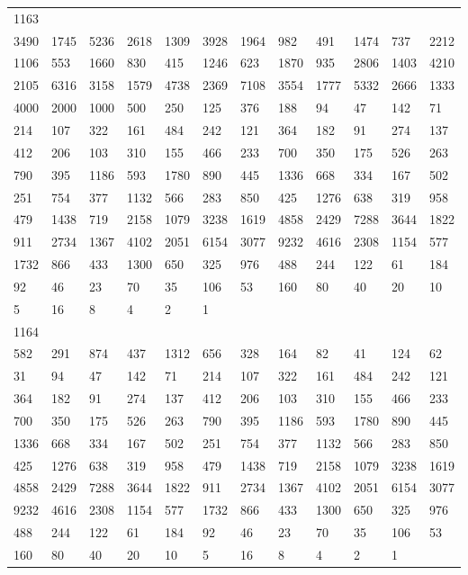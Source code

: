 \begin{longtable}{llllllllllll}
1163&&&&&&&&&&&\\
3490& 1745& 5236& 2618& 1309& 3928& 1964& 982& 491& 1474& 737& 2212\\
1106& 553& 1660& 830& 415& 1246& 623& 1870& 935& 2806& 1403& 4210\\
2105& 6316& 3158& 1579& 4738& 2369& 7108& 3554& 1777& 5332& 2666& 1333\\
4000& 2000& 1000& 500& 250& 125& 376& 188& 94& 47& 142& 71\\
214& 107& 322& 161& 484& 242& 121& 364& 182& 91& 274& 137\\
412& 206& 103& 310& 155& 466& 233& 700& 350& 175& 526& 263\\
790& 395& 1186& 593& 1780& 890& 445& 1336& 668& 334& 167& 502\\
251& 754& 377& 1132& 566& 283& 850& 425& 1276& 638& 319& 958\\
479& 1438& 719& 2158& 1079& 3238& 1619& 4858& 2429& 7288& 3644& 1822\\
911& 2734& 1367& 4102& 2051& 6154& 3077& 9232& 4616& 2308& 1154& 577\\
1732& 866& 433& 1300& 650& 325& 976& 488& 244& 122& 61& 184\\
92& 46& 23& 70& 35& 106& 53& 160& 80& 40& 20& 10\\
5& 16& 8& 4& 2& 1& \\

1164&&&&&&&&&&&\\
582& 291& 874& 437& 1312& 656& 328& 164& 82& 41& 124& 62\\
31& 94& 47& 142& 71& 214& 107& 322& 161& 484& 242& 121\\
364& 182& 91& 274& 137& 412& 206& 103& 310& 155& 466& 233\\
700& 350& 175& 526& 263& 790& 395& 1186& 593& 1780& 890& 445\\
1336& 668& 334& 167& 502& 251& 754& 377& 1132& 566& 283& 850\\
425& 1276& 638& 319& 958& 479& 1438& 719& 2158& 1079& 3238& 1619\\
4858& 2429& 7288& 3644& 1822& 911& 2734& 1367& 4102& 2051& 6154& 3077\\
9232& 4616& 2308& 1154& 577& 1732& 866& 433& 1300& 650& 325& 976\\
488& 244& 122& 61& 184& 92& 46& 23& 70& 35& 106& 53\\
160& 80& 40& 20& 10& 5& 16& 8& 4& 2& 1& \\


\end{longtable}
